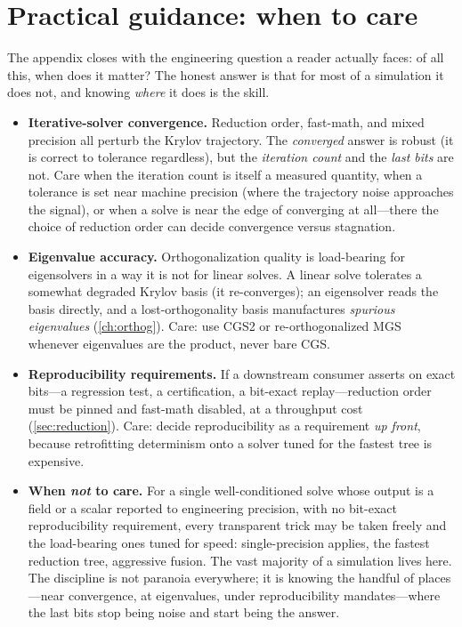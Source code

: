\section{Practical guidance: when to care}
\label{sec:guidance}

The appendix closes with the engineering question a reader actually faces: of all
this, when does it matter? The honest answer is that for most of a simulation it does
not, and knowing \emph{where} it does is the skill.

\begin{itemize}[leftmargin=1.4em]
\item \textbf{Iterative-solver convergence.} Reduction order, fast-math, and mixed
  precision all perturb the Krylov trajectory. The \emph{converged} answer is robust
  (it is correct to tolerance regardless), but the \emph{iteration count} and the
  \emph{last bits} are not. Care when the iteration count is itself a measured
  quantity, when a tolerance is set near machine precision (where the trajectory
  noise approaches the signal), or when a solve is near the edge of converging at
  all---there the choice of reduction order can decide convergence versus stagnation.

\item \textbf{Eigenvalue accuracy.} Orthogonalization quality is load-bearing for
  eigensolvers in a way it is not for linear solves. A linear solve tolerates a
  somewhat degraded Krylov basis (it re-converges); an eigensolver reads the basis
  directly, and a lost-orthogonality basis manufactures \emph{spurious eigenvalues}
  (\cref{ch:orthog}). Care: use CGS2 or re-orthogonalized MGS whenever eigenvalues
  are the product, never bare CGS.

\item \textbf{Reproducibility requirements.} If a downstream consumer asserts on
  exact bits---a regression test, a certification, a bit-exact replay---reduction
  order must be pinned and fast-math disabled, at a throughput cost
  (\cref{sec:reduction}). Care: decide reproducibility as a requirement \emph{up
  front}, because retrofitting determinism onto a solver tuned for the fastest tree
  is expensive.

\item \textbf{When \emph{not} to care.} For a single well-conditioned solve whose
  output is a field or a scalar reported to engineering precision, with no
  bit-exact reproducibility requirement, every transparent trick may be taken freely
  and the load-bearing ones tuned for speed: single-precision applies, the fastest
  reduction tree, aggressive fusion. The vast majority of a simulation lives here.
  The discipline is not paranoia everywhere; it is knowing the handful of places---near
  convergence, at eigenvalues, under reproducibility mandates---where the last bits
  stop being noise and start being the answer.
\end{itemize}

